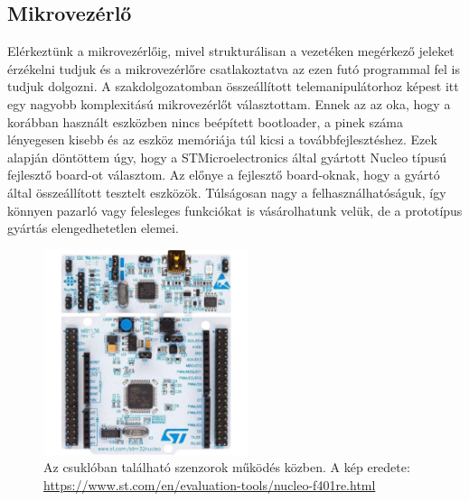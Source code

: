\subsection{Mikrovezérlő}
\label{sec:mikrovez_bemut}

Elérkeztünk a mikrovezérlőig, mivel strukturálisan a vezetéken megérkező jeleket érzékelni tudjuk és a mikrovezérlőre csatlakoztatva az ezen futó programmal fel is tudjuk dolgozni. A szakdolgozatomban összeállított telemanipulátorhoz képest itt egy nagyobb komplexitású mikrovezérlőt választottam. Ennek az az oka, hogy a korábban használt eszközben nincs beépített bootloader, a pinek száma lényegesen kisebb és az eszköz memóriája túl kicsi a továbbfejlesztéshez. Ezek alapján döntöttem úgy, hogy a STMicroelectronics által gyártott Nucleo típusú fejlesztő board-ot választom. Az előnye a fejlesztő board-oknak, hogy a gyártó által összeállított tesztelt eszközök. Túlságosan nagy a felhasználhatóságuk, így könnyen pazarló vagy felesleges funkciókat is vásárolhatunk velük, de a prototípus gyártás elengedhetetlen elemei.

\begin{figure}[!ht]
\centering
\includegraphics[width=60mm, keepaspectratio]{figures/Csuklo_szog_teszt/mikrovez}
\caption{Az csuklóban található szenzorok működés közben. A kép eredete: \url{https://www.st.com/en/evaluation-tools/nucleo-f401re.html}}
\label{fig:mikrovez}
\end{figure}

